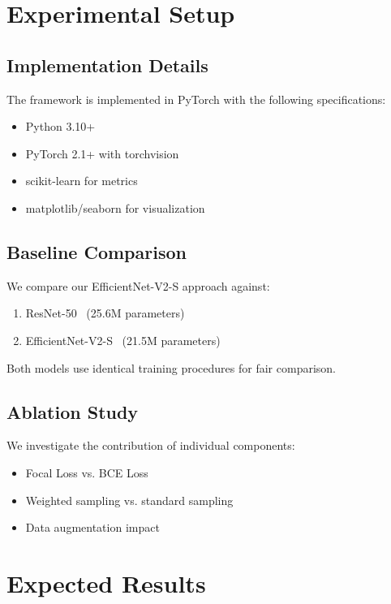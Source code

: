 \documentclass[12pt,a4paper]{article}
\begin{document}
\section{Experimental Setup}
\label{sec:experiments}

\subsection{Implementation Details}

The framework is implemented in PyTorch with the following specifications:
\begin{itemize}
    \item Python 3.10+
    \item PyTorch 2.1+ with torchvision
    \item scikit-learn for metrics
    \item matplotlib/seaborn for visualization
\end{itemize}

\subsection{Baseline Comparison}

We compare our EfficientNet-V2-S approach against:
\begin{enumerate}
    \item ResNet-50~\cite{he2016} (25.6M parameters)
    \item EfficientNet-V2-S~\cite{tan2021} (21.5M parameters)
\end{enumerate}

Both models use identical training procedures for fair comparison.

\subsection{Ablation Study}

We investigate the contribution of individual components:
\begin{itemize}
    \item Focal Loss vs. BCE Loss
    \item Weighted sampling vs. standard sampling
    \item Data augmentation impact
\end{itemize}

\section{Expected Results}
\label{sec:results}
\end{document}

